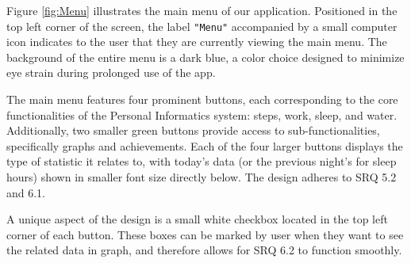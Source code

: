 \documentclass[12pt]{article}
\begin{document}
Figure \ref{fig:Menu} illustrates the main menu of our application. Positioned in the top left
corner of the screen, the label \texttt{"Menu"} accompanied by a small computer icon indicates
to the user that they are currently viewing the main menu. The background of the 
entire menu is a dark blue, a color choice designed to minimize eye strain during 
prolonged use of the app.\par

The main menu features four prominent buttons, each corresponding to the core 
functionalities of the Personal Informatics system: steps, work, sleep, and water.
Additionally, two smaller green buttons provide access to sub-functionalities, 
specifically graphs and achievements. Each of the four larger buttons displays 
the type of statistic it relates to, with today's data (or the previous night's
for sleep hours) shown in smaller font size directly below. The design adheres to SRQ 5.2 and 6.1.\par

A unique aspect of the design is a small white checkbox located in the top left
corner of each button. These boxes can be marked by user when they want to see
the related data in graph, and therefore allows for SRQ 6.2 to function smoothly.\par
\end{document}
